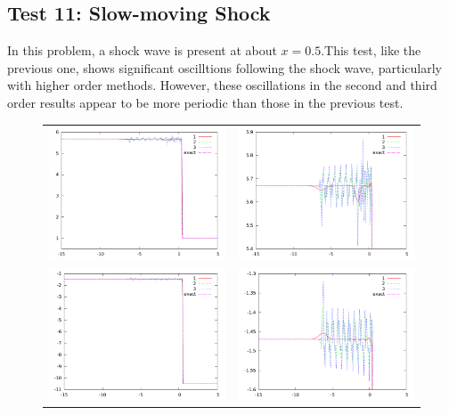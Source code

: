 \documentclass[10pt]{article}
\begin{document}
\subsection{Test 11: Slow-moving Shock}
In this problem, a shock wave is present at about $x=0.5$.This test, like the previous one, shows significant oscilltions following the shock wave, particularly with higher order methods. However, these oscillations in the second and third order results appear to be more periodic than those in the previous test. 
\begin{figure}[h]
  \begin{center}
	\begin{tabular}{cc}
      \includegraphics[width=.4\textwidth]{den_T11.png} &
	  \includegraphics[width=.4\textwidth]{den11zoom.png} \\
	  \includegraphics[width=.4\textwidth]{vel_T11.png} &	
	  \includegraphics[width=.4\textwidth]{vel11zoom.png} \\

\end{tabular}
\end{center}
\end{figure}
\end{document}
